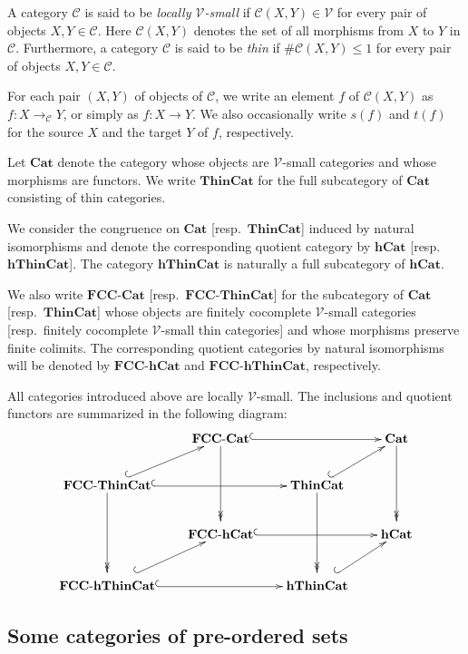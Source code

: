 \documentclass[12pt, a4paper]{amsart}
\theoremstyle{definition}
\newcommand{\FCCCat}{\mathbf{FCC}\text{-}\mathbf{Cat}}
\newcommand{\FCCThinCat}{\mathbf{FCC}\text{-}\mathbf{ThinCat}}
\newcommand{\FCChCat}{\mathbf{FCC}\text{-}\mathbf{hCat}}
\newcommand{\Cat}{{\mathbf{Cat}}}
\newcommand{\ThinCat}{{\mathbf{ThinCat}}}
\newcommand{\hCat}{{\mathbf{hCat}}}
\newcommand{\hThinCat}{{\mathbf{hThinCat}}}
\newcommand{\FCChThinCat}{{\mathbf{FCC}\text{-}\mathbf{hThinCat}}}
\begin{document}
A category $\mathcal{C}$ is said to be \emph{locally $\mathcal{V}$-small} if
$\mathcal{C}(X,Y)\in\mathcal{V}$
for every pair of objects $X,Y\in\mathcal{C}$.
Here $\mathcal{C}(X,Y)$ denotes the set of all morphisms from $X$ to $Y$ in
$\mathcal{C}$.
Furthermore, a category $\mathcal{C}$ is said to be \emph{thin} if
$\#\mathcal{C}(X,Y)\le 1$
for every pair of objects $X,Y\in\mathcal{C}$.

For each pair $(X,Y)$ of objects of $\mathcal{C}$, we write an element $f$ of $\mathcal{C}(X,Y)$ as $f : X \rightarrow_{\mathcal{C}} Y$, or simply as $f : X \rightarrow Y$. We also occasionally write $s(f)$ and $t(f)$ for the source $X$ and the target $Y$ of $f$, respectively.

Let $\Cat$ denote the category whose objects are $\mathcal{V}$-small
categories and whose morphisms are functors.
We write $\ThinCat$ for the full subcategory of $\Cat$ consisting of thin
categories.

We consider the congruence on $\Cat$ [resp.~$\ThinCat$] induced by natural
isomorphisms and denote the corresponding quotient category by
$\hCat$ [resp.~$\hThinCat$].
The category $\hThinCat$ is naturally a full subcategory of $\hCat$.

We also write $\FCCCat$ [resp.~$\FCCThinCat$] for the subcategory of
$\Cat$ [resp.~$\ThinCat$] whose objects are finitely cocomplete
$\mathcal{V}$-small categories
[resp.~finitely cocomplete $\mathcal{V}$-small thin categories]
and whose morphisms preserve finite colimits.
The corresponding quotient categories by natural isomorphisms will be
denoted by $\FCChCat$ and $\FCChThinCat$, respectively.

All categories introduced above are locally $\mathcal{V}$-small.
The inclusions and quotient functors are summarized in the following diagram:
\[
\xymatrix@C=2em@R=2.4em{
&
\FCCCat \ar@{^{(}->}[rr]
         \ar@{->>}[dd]
&&
\Cat \ar@{->>}[dd]
\\
\FCCThinCat \ar@{^{(}->}[ur]
             \ar@{^{(}->}[rr]
             \ar@{->>}[dd]
&&
\ThinCat \ar@{^{(}->}[ur]
            \ar@{->>}[dd]
&
\\
&
\rule{0pt}{2.5ex}\FCChCat \ar@{^{(}->}[rr]
&&
\rule{0pt}{2.5ex}\hCat
\\
\rule{0pt}{2.5ex}\FCChThinCat \ar@{^{(}->}[ur]
                               \ar@{^{(}->}[rr]
&&
\rule{0pt}{2.5ex}\hThinCat \ar@{^{(}->}[ur]
&
}
\]

\subsection{Some categories of pre-ordered sets}\label{subsection:pre-order_category}
\end{document}
